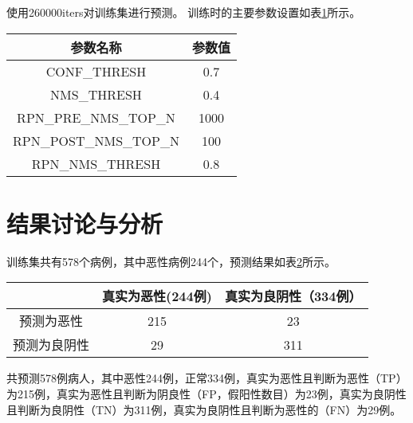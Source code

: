 \begin{comment}
下降loss曲线如图\ref{fig:stage2_2_loss}所示。
\begin{figure}[!htbp]
    \centering
    \texttt{[image: stage2\_2\_loss]}
    \bicaption{weakFaster R-CNN第二阶段loss下降曲线}{The second stage loss curve of weakFaster R-CNN}
    \label{fig:stage2_2_loss}
\end{figure}
\end{comment}
使用260000iters对训练集进行预测。
训练时的主要参数设置如表\ref{tab:2_stage_2_pred_config}所示。
\begin{table}[!htbp]
    \label{tab:2_stage_2_pred_config}
    \centering
    \footnotesize%
    \setlength{\tabcolsep}{4pt}%
    \renewcommand{\arraystretch}{1.2}%
    \begin{tabular}{cc}
        \hline
        参数名称& 参数值\\
        \hline
        CONF\_THRESH& 0.7\\
        NMS\_THRESH& 0.4\\
        RPN\_PRE\_NMS\_TOP\_N & 1000\\
        RPN\_POST\_NMS\_TOP\_N & 100\\
        RPN\_NMS\_THRESH & 0.8\\    
        \hline
    \end{tabular}
\end{table}
\section{结果讨论与分析}

训练集共有578个病例，其中恶性病例244个，预测结果如表\ref{tab:2_stage_2_pred_result_in_training_set}所示。
\begin{table}[!htbp]
    \label{tab:2_stage_2_pred_result_in_training_set}
    \centering
    \footnotesize%
    \setlength{\tabcolsep}{4pt}%
    \renewcommand{\arraystretch}{1.2}%
    \begin{tabular}{ccc}
        \hline
        &真实为恶性(244例)& 真实为良阴性（334例）\\
        \hline
        预测为恶性& 215 &23 \\
        预测为良阴性& 29 &311 \\
        \hline
    \end{tabular}
\end{table}
共预测578例病人，其中恶性244例，正常334例，真实为恶性且判断为恶性（TP）为215例，真实为恶性且判断为阴良性（FP，假阳性数目）为23例，真实为良阴性且判断为良阴性（TN）为311例，真实为良阴性且判断为恶性的（FN）为29例。

